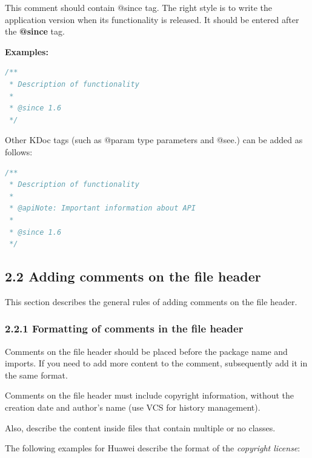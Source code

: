 This comment should contain @since tag. The right style is to write the application version when its functionality is released. It should be entered after the \textbf{@since} tag.



\textbf{Examples:}



\begin{lstlisting}[language=Kotlin]
/**
 * Description of functionality
 *
 * @since 1.6
 */
\end{lstlisting}


Other KDoc tags (such as @param type parameters and @see.) can be added as follows:

\begin{lstlisting}[language=Kotlin]
/**
 * Description of functionality
 *
 * @apiNote: Important information about API
 *
 * @since 1.6
 */
\end{lstlisting}


\subsection*{\textbf{2.2 Adding comments on the file header}}

\label{sec:2.2}



This section describes the general rules of adding comments on the file header.



\subsubsection*{\textbf{2.2.1 Formatting of comments in the file header}}
\leavevmode\newline

\label{sec:2.2.1}



Comments on the file header should be placed before the package name and imports. If you need to add more content to the comment, subsequently add it in the same format.



Comments on the file header must include copyright information, without the creation date and author's name (use VCS for history management).

Also, describe the content inside files that contain multiple or no classes.



The following examples for Huawei describe the format of the \textit{copyright license}: \

